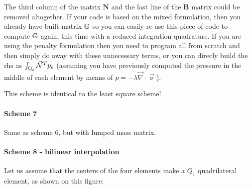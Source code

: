 \begin{remark}
The third column of the matrix ${\bm N}$
and the last line of the ${\bm B}$ matrix could be removed altogether.
If your code is based on the mixed formulation, then you already 
have built matrix ${\mathbb{G}}$ so you can easily re-use this piece of code 
to compute ${\mathbb{G}}$ again, this time with a reduced integration quadrature.
If you are using the penalty formulation then you need to program 
all from scratch and then simply do away with these unnecessary terms, or 
you can direcly build the rhs as $\int_{\Omega_e} \vec{{\mathcal{N}}}^T p_e$ (assuming
you have previously computed the pressure in the middle of each element 
by means of $p=-\lambda\vec\nabla\cdot\vec\upnu$).
\end{remark}

\begin{remark}
This  scheme is identical to the least square scheme!
\end{remark}


\paragraph{Scheme 7}

Same as scheme 6, but with lumped mass matrix.  


\paragraph{Scheme 8 - bilinear interpolation} Let us assume that the centers of the 
four elements make a $Q_1$ quadrilateral element, as shown on this figure:


